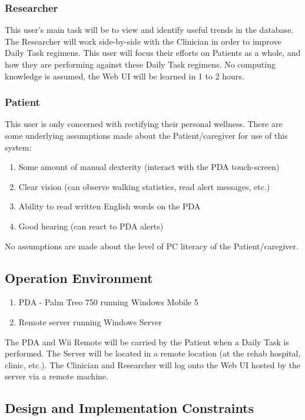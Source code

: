 \documentclass{article}
\begin{document}
\subsubsection{Researcher}
This user's main task will be to view and identify useful trends in the database. The Researcher will work side-by-side with the Clinician in order to improve Daily Task regimens. This user will focus their efforts on Patients as a whole, and how they are performing against these Daily Task regimens. No computing knowledge is assumed, the Web UI will be learned in 1 to 2 hours.

\subsubsection{Patient}
This user is only concerned with rectifying their personal wellness. There are some underlying assumptions made about the Patient/caregiver for use of this system:
\begin{enumerate}
\item Some amount of manual dexterity (interact with the PDA touch-screen)
\item Clear vision (can observe walking statistics, read alert messages, etc.)
\item Ability to read written English words on the PDA
\item Good hearing (can react to PDA alerts)
\end{enumerate}
No assumptions are made about the level of PC literacy of the Patient/caregiver.


\subsection {Operation Environment}

\begin{enumerate}
\item PDA - Palm Treo 750 running Windows Mobile 5
\item Remote server running Windows Server
\end{enumerate}

The PDA and Wii Remote will be carried by the Patient when a Daily Task is performed. The Server will be located in a remote location (at the rehab hospital, clinic, etc.). The Clinician and Researcher will log onto the Web UI hosted by the server via a remote machine.

\subsection {Design and Implementation Constraints}
\end{document}

